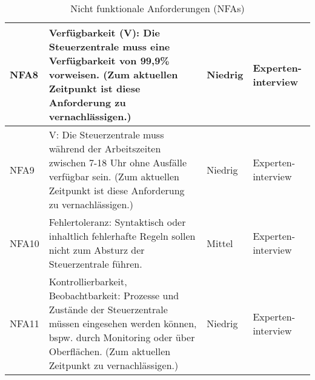 \begin{table}[hbt!]
\begin{center}
\begin{tabular}{ | p{1.0cm} | p{9.7cm} | p{1.6cm} | p{2.6cm} | }
            \hline
                NFA8 & Verfügbarkeit (V): Die Steuerzentrale muss eine Verfügbarkeit von 99,9\% vorweisen. (Zum aktuellen Zeitpunkt ist diese Anforderung zu vernachlässigen.) & Niedrig & Experten-interview \\ 
            \hline
                NFA9 & V: Die Steuerzentrale muss während der Arbeitszeiten zwischen 7-18 Uhr ohne Ausfälle verfügbar sein. (Zum aktuellen Zeitpunkt ist diese Anforderung zu vernachlässigen.) & Niedrig & Experten-interview \\ 
            \hline
                NFA10 & Fehlertoleranz: Syntaktisch oder inhaltlich fehlerhafte Regeln sollen nicht zum Absturz der Steuerzentrale führen. & Mittel & Experten-interview \\ 
            \hline  
                NFA11 & Kontrollierbarkeit, Beobachtbarkeit: Prozesse und Zustände der Steuerzentrale müssen eingesehen werden können, bspw. durch Monitoring oder über Oberflächen. (Zum aktuellen Zeitpunkt zu vernachlässigen.) & Niedrig & Experten-interview \\
            \hline
        \end{tabular}
    \end{center}
    \caption{Nicht funktionale Anforderungen (NFAs)}
    \label{tab:notfunctionalRequirements}
\end{table}